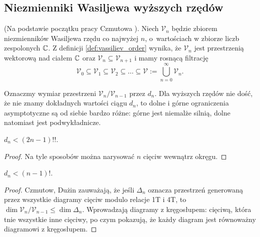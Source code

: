 
\subsection{Niezmienniki Wasiljewa wyższych rzędów}
(Na podstawie początku pracy Czmutowa \cite{chmutov12}).
%
Niech $\mathcal V_n$ będzie zbiorem niezmienników Wasiljewa rzędu co najwyżej $n$, o~wartościach w zbiorze liczb zespolonych $\mathbb C$.
Z definicji \ref{def:vassiliev_order} wynika, że $\mathcal V_n$ jest przestrzenią wektorową nad ciałem $\mathbb C$ oraz $\mathcal V_n \subseteq \mathcal V_{n+1}$ i mamy rosnącą filtrację
\begin{equation}
    \mathcal V_0 \subseteq \mathcal V_1 \subseteq \mathcal V_2 \subseteq \ldots \subseteq \mathcal V := \bigcup_{n=0}^\infty \mathcal V_n.
\end{equation}

Oznaczmy wymiar przestrzeni $\mathcal V_n / \mathcal V_{n-1}$ przez $d_n$.
Dla wyższych rzędów nie dość, że nie znamy dokładnych wartości ciągu $d_n$, to dolne i górne ograniczenia asymptotyczne są od siebie bardzo różne: górne jest niemalże silnią, dolne natomiast jest podwykładnicze.

\begin{proposition}
    $d_n < (2n-1)!!$.
\end{proposition}

\begin{proof}
    Na tyle sposobów można narysować $n$ cięciw wewnątrz okręgu.
\end{proof}

\begin{proposition}
    $d_n < (n-1)!$.
\end{proposition}

\begin{proof}
%
%
%
    Czmutow, Dużin \cite{chmutovduzhin94} zauważają, że jeśli $\Delta_n$ oznacza przestrzeń generowaną przez wszystkie diagramy cięciw modulo relacje 1T i 4T, to $\dim \mathcal V_n/\mathcal V_{n-1} \le \dim \Delta_n$.
    Wprowadzają diagramy z kręgosłupem: cięciwą, która tnie wszystkie inne cięciwy, po czym pokazują, że każdy diagram jest równoważny diagramowi z kręgosłupem.
\end{proof}

